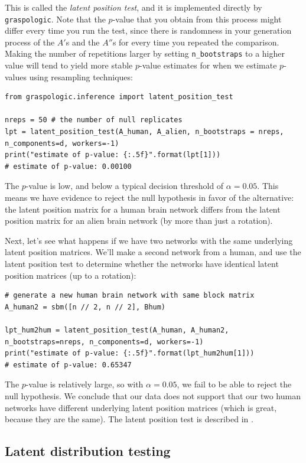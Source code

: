 This is called the \textit{latent position test}, and it is implemented directly by \texttt{graspologic}. Note that the $p$-value that you obtain from this process might differ every time you run the test, since there is randomness in your generation process of the $A'$s and the $A''$s for every time you repeated the comparison. Making the number of repetitions larger by setting \texttt{n\_bootstraps} to a higher value will tend to yield more stable $p$-value estimates for when we estimate $p$-values using resampling techniques:
\begin{lstlisting}[style=python]
from graspologic.inference import latent_position_test

nreps = 50 # the number of null replicates
lpt = latent_position_test(A_human, A_alien, n_bootstraps = nreps, n_components=d, workers=-1)
print("estimate of p-value: {:.5f}".format(lpt[1]))
# estimate of p-value: 0.00100
\end{lstlisting}
The $p$-value is low, and below a typical decision threshold of $\alpha = 0.05$. This means we have evidence to reject the null hypothesis in favor of the alternative: the latent position matrix for a human brain network differs from the latent position matrix for an alien brain network (by more than just a rotation).

Next, let's see what happens if we have two networks with the same underlying latent position matrices. We'll make a second network from a human, and use the latent position test to determine whether the networks have identical latent position matrices (up to a rotation):
\begin{lstlisting}[style=python]
# generate a new human brain network with same block matrix
A_human2 = sbm([n // 2, n // 2], Bhum)

lpt_hum2hum = latent_position_test(A_human, A_human2, n_bootstraps=nreps, n_components=d, workers=-1)
print("estimate of p-value: {:.5f}".format(lpt_hum2hum[1]))
# estimate of p-value: 0.65347
\end{lstlisting}
The $p$-value is relatively large, so with $\alpha = 0.05$, we fail to be able to reject the null hypothesis. We conclude that our data does not support that our two human networks have different underlying latent position matrices (which is great, because they are the same). The latent position test is described in \cite{Tang2017Apr}.

\subsection{Latent distribution testing}


